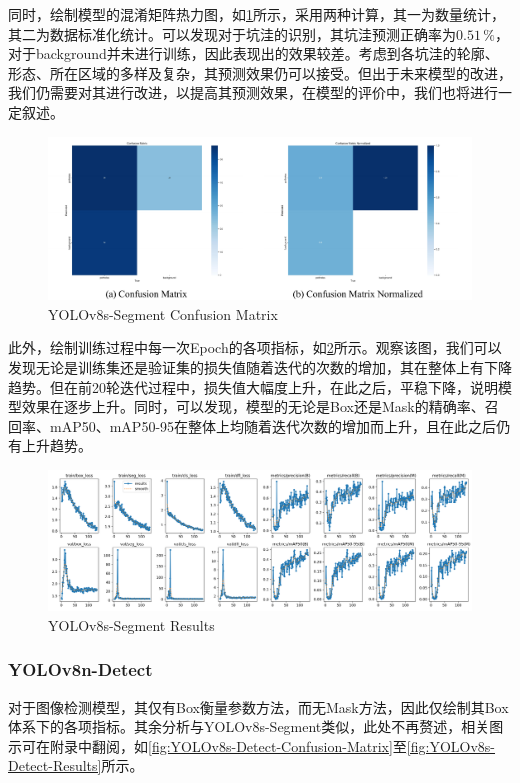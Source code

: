\documentclass{MathorCupmodeling}
\begin{document}
	同时，绘制模型的混淆矩阵热力图，如\textcolor{blue}{\cref{fig:YOLOv8s-Segment-ConfusionMatrix}}所示，采用两种计算，其一为数量统计，其二为数据标准化统计。可以发现对于坑洼的识别，其坑洼预测正确率为$0.51\,\%$，对于background并未进行训练，因此表现出的效果较差。考虑到各坑洼的轮廓、形态、所在区域的多样及复杂，其预测效果仍可以接受。但出于未来模型的改进，我们仍需要对其进行改进，以提高其预测效果，在模型的评价中，我们也将进行一定叙述。
	\begin{figure}[H]
		\centering
		\includegraphics[scale=0.66]{Figures/segment/SegmentConfusionMatrix.pdf}
		\caption{YOLOv8s-Segment Confusion Matrix}
		\label{fig:YOLOv8s-Segment-ConfusionMatrix}
	\end{figure}
	
	此外，绘制训练过程中每一次Epoch的各项指标，如\textcolor{blue}{\cref{fig:YOLOv8s-Segment-Results}}所示。观察该图，我们可以发现无论是训练集还是验证集的损失值随着迭代的次数的增加，其在整体上有下降趋势。但在前20轮迭代过程中，损失值大幅度上升，在此之后，平稳下降，说明模型效果在逐步上升。同时，可以发现，模型的无论是Box还是Mask的精确率、召回率、mAP50、mAP50-95在整体上均随着迭代次数的增加而上升，且在此之后仍有上升趋势。
	\begin{figure}[H]
		\centering
		\includegraphics[scale=0.37]{Figures/segment/SegmentResults.png}
		\caption{YOLOv8s-Segment Results}
		\label{fig:YOLOv8s-Segment-Results}
	\end{figure}
  
	\subsubsection{YOLOv8n-Detect}
	对于图像检测模型，其仅有Box衡量参数方法，而无Mask方法，因此仅绘制其Box体系下的各项指标。其余分析与YOLOv8s-Segment类似，此处不再赘述，相关图示可在附录中翻阅，如\textcolor{blue}{\cref{fig:YOLOv8s-Detect-Confusion-Matrix}}至\textcolor{blue}{\cref{fig:YOLOv8s-Detect-Results}}所示。
	
\end{document}
